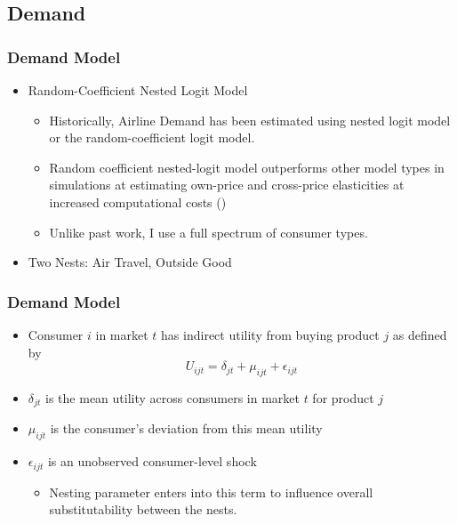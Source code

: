 \documentclass[xcolor=dvipsnames]{beamer}
\let\Oldsubsection\subsection
\renewcommand{\subsection}{\FloatBarrier\Oldsubsection}
\begin{document}
    \subsection{Demand}
        \begin{frame}
        \frametitle{Demand Model}
        \begin{itemize}
            \item Random-Coefficient Nested Logit Model 
            \begin{itemize}
                \item Historically, Airline Demand has been estimated using nested logit model or the random-coefficient logit model.
                \item Random coefficient nested-logit model outperforms other model types in simulations at estimating own-price and cross-price elasticities at increased computational costs (\cite{grigolon_nested_2014})
                \item Unlike past work, I use a full spectrum of consumer types.
            \end{itemize}
            \item Two Nests: Air Travel, Outside Good
        \end{itemize}
    \end{frame}

    \begin{frame}[label = {Demand_Overview}]
        \frametitle{Demand Model}
        \begin{itemize}
            \item  Consumer $i$ in market $t$ has indirect utility from buying product $j$ as defined by 
\[U_{ijt} = \delta_{jt} + \mu_{ijt} + \epsilon_{ijt}\]
        \item $\delta_{jt}$ is the mean utility across consumers in market $t$ for product $j$
		\item $\mu_{ijt}$ is the consumer's deviation from this mean utility
		\item  $\epsilon_{ijt}$ is an unobserved consumer-level shock
        \begin{itemize}
            \item Nesting parameter enters into this term to influence overall substitutability between the nests. 
        \end{itemize}
        \end{itemize}
        \hyperlink{Full_Parameterization}{}
    \end{frame}
\end{document}

